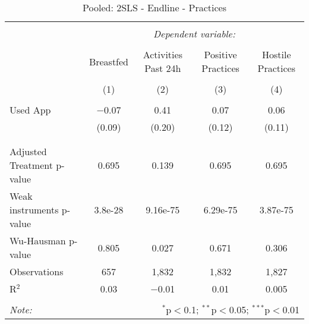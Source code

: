 
\begin{table}[!htbp] \centering 
  \caption{Pooled: 2SLS - Endline - Practices} 
  \label{tbl:Pooled: 2SLS - Endline - Practices} 
\begin{tabular}{@{\extracolsep{5pt}}lcccc} 
\\[-1.8ex]\hline 
\hline \\[-1.8ex] 
 & \multicolumn{4}{c}{\textit{Dependent variable:}} \\ 
\cline{2-5} 
\\[-1.8ex] & Breastfed & Activities Past 24h & Positive Practices & Hostile Practices \\ 
\\[-1.8ex] & (1) & (2) & (3) & (4)\\ 
\hline \\[-1.8ex] 
 Used App & $-$0.07 & 0.41 & 0.07 & 0.06 \\ 
  & (0.09) & (0.20) & (0.12) & (0.11) \\ 
  & & & & \\ 
\hline \\[-1.8ex] 
Adjusted Treatment p-value & 0.695 & 0.139 & 0.695 & 0.695 \\ 
Weak instruments p-value & 3.8e-28 & 9.16e-75 & 6.29e-75 & 3.87e-75 \\ 
Wu-Hausman p-value & 0.805 & 0.027 & 0.671 & 0.306 \\ 
Observations & 657 & 1,832 & 1,832 & 1,827 \\ 
R$^{2}$ & 0.03 & $-$0.01 & 0.01 & 0.005 \\ 
\hline 
\hline \\[-1.8ex] 
\textit{Note:}  & \multicolumn{4}{r}{$^{*}$p$<$0.1; $^{**}$p$<$0.05; $^{***}$p$<$0.01} \\ 
\end{tabular} 
\end{table} 
